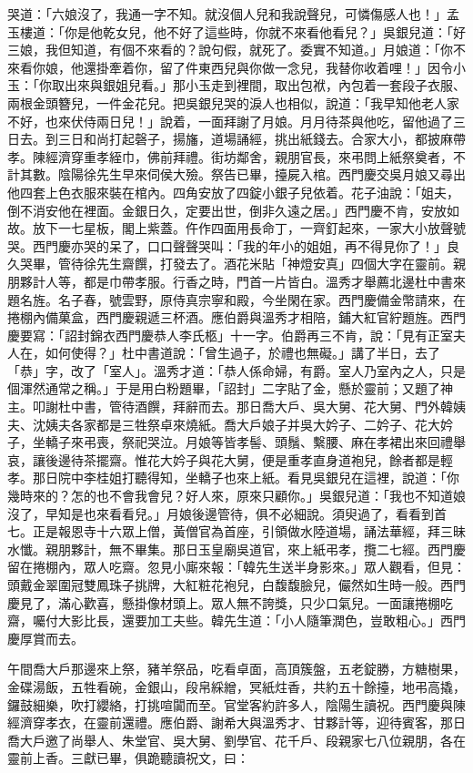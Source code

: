 哭道：「六娘沒了，我通一字不知。就沒個人兒和我說聲兒，可憐傷感人也！」孟玉樓道：「你是他乾女兒，他不好了這些時，你就不來看他看兒？」吳銀兒道：「好三娘，我但知道，有個不來看的？說句假，就死了。委實不知道。」月娘道：「你不來看你娘，他還掛牽着你，留了件東西兒與你做一念兒，我替你收着哩！」因令小玉：「你取出來與銀姐兒看。」那小玉走到裡間，取出包袱，內包着一套段子衣服、兩根金頭簪兒，一件金花兒。把吳銀兒哭的淚人也相似，說道：「我早知他老人家不好，也來伏侍兩日兒！」說着，一面拜謝了月娘。月月待茶與他吃，留他過了三日去。到三日和尚打起磬子，揚旛，道場誦經，挑出紙錢去。合家大小，都披麻帶孝。陳經濟穿重孝絰巾，佛前拜禮。街坊鄰舍，親朋官長，來弔問上紙祭奠者，不計其數。陰陽徐先生早來伺侯大殮。祭告已畢，擡屍入棺。西門慶交吳月娘又尋出他四套上色衣服來裝在棺內。四角安放了四錠小銀子兒依着。花子油說：「姐夫，倒不消安他在裡面。金銀日久，定要出世，倒非久遠之居。」西門慶不肯，安放如故。放下一七星板，閣上紫蓋。仵作四面用長命丁，一齊釘起來，一家大小放聲號哭。西門慶亦哭的呆了，口口聲聲哭叫：「我的年小的姐姐，再不得見你了！」良久哭畢，管待徐先生齋饌，打發去了。酒花米貼「神燈安真」四個大字在靈前。親朋夥計人等，都是巾帶孝服。行香之時，門首一片皆白。溫秀才舉薦北邊杜中書來題名旌。名子春，號雲野，原侍真宗寧和殿，今坐閑在家。西門慶備金幣請來，在捲棚內備菓盒，西門慶親遞三杯酒。應伯爵與溫秀才相陪，鋪大紅官紵題旌。西門慶要寫：「詔封錦衣西門慶恭人李氏柩」十一字。伯爵再三不肯，說：「見有正室夫人在，如何使得？」杜中書道說：「曾生過子，於禮也無礙。」講了半日，去了「恭」字，改了「室人」。溫秀才道：「恭人係命婦，有爵。室人乃室內之人，只是個渾然通常之稱。」于是用白粉題畢，「詔封」二字貼了金，懸於靈前；又題了神主。叩謝杜中書，管待酒饌，拜辭而去。那日喬大戶、吳大舅、花大舅、門外韓姨夫、沈姨夫各家都是三牲祭卓來燒紙。喬大戶娘子并吳大妗子、二妗子、花大妗子，坐轎子來弔喪，祭祀哭泣。月娘等皆孝髻、頭鬚、繫腰、麻在孝裙出來回禮舉哀，讓後邊待茶擺齋。惟花大妗子與花大舅，便是重孝直身道袍兒，餘者都是輕孝。那日院中李桂姐打聽得知，坐轎子也來上紙。看見吳銀兒在這裡，說道：「你幾時來的？怎的也不會我會兒？好人來，原來只顧你。」吳銀兒道：「我也不知道娘沒了，早知是也來看看兒。」月娘後邊管待，俱不必細說。須臾過了，看看到首七。正是報恩寺十六眾上僧，黃僧官為首座，引領做水陸道場，誦法華經，拜三昧水懺。親朋夥計，無不畢集。那日玉皇廟吳道官，來上紙弔孝，攬二七經。西門慶留在捲棚內，眾人吃齋。忽見小廝來報：「韓先生送半身影來。」眾人觀看，但見：頭戴金翠圍冠雙鳳珠子挑牌，大紅粧花袍兒，白馥馥臉兒，儼然如生時一般。西門慶見了，滿心歡喜，懸掛像材頭上。眾人無不誇獎，只少口氣兒。一面讓捲棚吃齋，囑付大影比長，還要加工夫些。韓先生道：「小人隨筆潤色，豈敢粗心。」西門慶厚賞而去。

午間喬大戶那邊來上祭，豬羊祭品，吃看卓面，高頂簇盤，五老錠勝，方糖樹果，金碟湯飯，五牲看碗，金銀山，段帛綵繒，冥紙炷香，共約五十餘擡，地弔高撬，鑼鼓細樂，吹打纓絡，打挑喧闐而至。官堂客約許多人，陰陽生讀祝。西門慶與陳經濟穿孝衣，在靈前還禮。應伯爵、謝希大與溫秀才、甘夥計等，迎待賓客，那日喬大戶邀了尚舉人、朱堂官、吳大舅、劉學官、花千戶、段親家七八位親朋，各在靈前上香。三獻已畢，俱跪聽讀祝文，曰：

